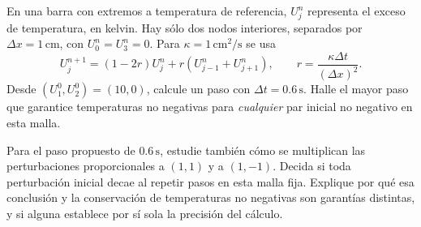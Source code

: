 En una barra con extremos a temperatura de referencia, \(U_j^n\) representa el exceso de temperatura, en kelvin. Hay sólo dos nodos interiores, separados por \(\Delta x=1\,\mathrm{cm}\), con \(U_0^n=U_3^n=0\). Para \(\kappa=1\,\mathrm{cm^2/s}\) se usa
\[
U_j^{n+1}=(1-2r)U_j^n+r(U_{j-1}^n+U_{j+1}^n),\qquad
r=\frac{\kappa\Delta t}{(\Delta x)^2}.
\]
Desde \((U_1^0,U_2^0)=(10,0)\), calcule un paso con \(\Delta t=0.6\,\mathrm{s}\). Halle el mayor paso que garantice temperaturas no negativas para \emph{cualquier} par inicial no negativo en esta malla.

Para el paso propuesto de \(0.6\,\mathrm{s}\), estudie también cómo se multiplican las perturbaciones proporcionales a \((1,1)\) y a \((1,-1)\). Decida si toda perturbación inicial decae al repetir pasos en esta malla fija. Explique por qué esa conclusión y la conservación de temperaturas no negativas son garantías distintas, y si alguna establece por sí sola la precisión del cálculo.

